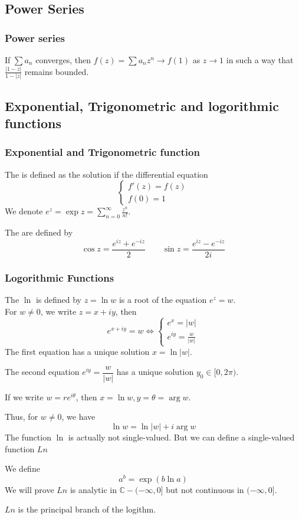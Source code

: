 
\subsection{Power Series}
\subsubsection{Power series}
\begin{theorem}
If  $ \sum a_n  $ converges, then  $ f(z)=\sum a_nz^n\rightarrow f(1)  $ as  $ z\rightarrow 1  $ in such a way that  $ \frac{|1-z| }{1-|z| } $ remains bounded.
\end{theorem}
\subsection{Exponential, Trigonometric and logorithmic functions}
\subsubsection{Exponential and Trigonometric function}
The  is defined as the solution if the differential equation
\[\left\{
    \begin{aligned}
        f'(z)=f(z)\\
        f(0)=1
    \end{aligned}
\right.\]
We denote  $ e^z=\exp z=\sum\limits_{n=0}^\infty \frac{z^n}{n!} $.

The  are defined by 
\[\cos z=\frac{e^{iz}+e^{-iz}}{2}\qquad \sin z=\frac{e^{iz}-e^{-iz}}{2i}\]
\subsubsection{Logorithmic Functions}
The   $ \ln  $ is defined by  $ z=\ln w  $ is a root of the equation  $ e^z=w $.\\
For  $ w\neq0 $, we write  $ z=x+iy $, then 
\[e^{x+iy}=w\Leftrightarrow 
\left\{
    \begin{aligned}
        e^x=|w|\\
        e^{iy}=\frac{w }{|w|}
    \end{aligned}
\right.\]   
The first equation has a unique solution  $ x=\ln|w|  $.

The second equation  $ e^{iy}=\dfrac{w }{|w|}  $ has a unique solution  $ y_0\in [0,2\pi) $.

If we write  $ w=re^{i\theta} $, then  $ x=\ln w,y=\theta =\arg w $.

Thus, for  $ w\neq0  $, we have 
\[\ln w=\ln|w|+i\arg w\]
The function  $ \ln  $ is actually not single-valued. But we can define a single-valued function  $ Ln $ 

We define 
\[a^b=\exp(b\ln a)\]   
We will prove  $ Ln  $ is analytic in  $ \mathbb{C}-(-\infty,0] $ but not continuous in  $ (-\infty,0] $.

$ Ln  $ is the principal branch of the logithm.   